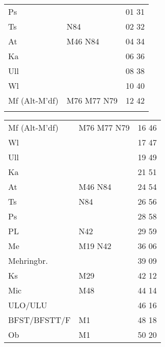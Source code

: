 \begin{tabular}{!{\color{schiefergrau}\vrule width 3pt}*{3}{l!{\color{schiefergrau}\vrule width 3pt}}}
Ps           &                                     & 01 31 \\
Ts           & \nbus{} N84                         & 02 32 \\
At           & \mbus{} M46 \nbus{} N84             & 04 34 \\
Ka           &                                     & 06 36 \\
Ull          &                                     & 08 38 \\
Wl           &                                     & 10 40 \\
Mf (Alt-M'df)& \mbus{} M76 M77 \nbus{} N79         & 12 42 \\
\myhline
\end{tabular}
%
\begin{tabular}{!{\color{schiefergrau}\vrule width 3pt}*{3}{l!{\color{schiefergrau}\vrule width 3pt}}}
\hline
{}
 \\
\hline
Mf (Alt-M'df)& \mbus{} M76 M77 \nbus{} N79         & 16 46 \\
Wl           &                                     & 17 47 \\
Ull          &                                     & 19 49 \\
Ka           &                                     & 21 51 \\
At           & \mbus{} M46 \nbus{} N84             & 24 54 \\
Ts           & \nbus{} N84                         & 26 56 \\
Ps           &                                     & 28 58 \\
PL           & \nbus{} N42                         & 29 59 \\
Me           & \nusieben{} \mbus{} M19 \nbus{} N42 & 36 06 \\
Mehringbr.   & \nueins{}                           & 39 09 \\
Ks           & \mbus{} M29                         & 42 12 \\
Mic          & \mbus{} M48                         & 44 14 \\
ULO/ULU      & \nuzwei{}                           & 46 16 \\
BFST/BFSTT/F & \mtram{} M1                         & 48 18 \\
Ob           & \mtram{} M1                         & 50 20 \\

\end{tabular}
